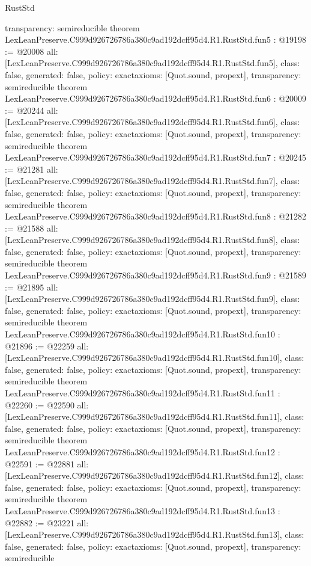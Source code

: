 \begin{lexlean}{RustStd}
\begin{coremodule}
{  transparency: semireducible
}
theorem LexLeanPreserve.C999d926726786a380c9ad192dcff95d4.R1.RustStd.fun5 : @19198 := @20008 {
  all: [LexLeanPreserve.C999d926726786a380c9ad192dcff95d4.R1.RustStd.fun5],
  class: false,
  generated: false,
  policy: exact{axioms: [Quot.sound, propext]},
  transparency: semireducible
}
theorem LexLeanPreserve.C999d926726786a380c9ad192dcff95d4.R1.RustStd.fun6 : @20009 := @20244 {
  all: [LexLeanPreserve.C999d926726786a380c9ad192dcff95d4.R1.RustStd.fun6],
  class: false,
  generated: false,
  policy: exact{axioms: [Quot.sound, propext]},
  transparency: semireducible
}
theorem LexLeanPreserve.C999d926726786a380c9ad192dcff95d4.R1.RustStd.fun7 : @20245 := @21281 {
  all: [LexLeanPreserve.C999d926726786a380c9ad192dcff95d4.R1.RustStd.fun7],
  class: false,
  generated: false,
  policy: exact{axioms: [Quot.sound, propext]},
  transparency: semireducible
}
theorem LexLeanPreserve.C999d926726786a380c9ad192dcff95d4.R1.RustStd.fun8 : @21282 := @21588 {
  all: [LexLeanPreserve.C999d926726786a380c9ad192dcff95d4.R1.RustStd.fun8],
  class: false,
  generated: false,
  policy: exact{axioms: [Quot.sound, propext]},
  transparency: semireducible
}
theorem LexLeanPreserve.C999d926726786a380c9ad192dcff95d4.R1.RustStd.fun9 : @21589 := @21895 {
  all: [LexLeanPreserve.C999d926726786a380c9ad192dcff95d4.R1.RustStd.fun9],
  class: false,
  generated: false,
  policy: exact{axioms: [Quot.sound, propext]},
  transparency: semireducible
}
theorem LexLeanPreserve.C999d926726786a380c9ad192dcff95d4.R1.RustStd.fun10 : @21896 := @22259 {
  all: [LexLeanPreserve.C999d926726786a380c9ad192dcff95d4.R1.RustStd.fun10],
  class: false,
  generated: false,
  policy: exact{axioms: [Quot.sound, propext]},
  transparency: semireducible
}
theorem LexLeanPreserve.C999d926726786a380c9ad192dcff95d4.R1.RustStd.fun11 : @22260 := @22590 {
  all: [LexLeanPreserve.C999d926726786a380c9ad192dcff95d4.R1.RustStd.fun11],
  class: false,
  generated: false,
  policy: exact{axioms: [Quot.sound, propext]},
  transparency: semireducible
}
theorem LexLeanPreserve.C999d926726786a380c9ad192dcff95d4.R1.RustStd.fun12 : @22591 := @22881 {
  all: [LexLeanPreserve.C999d926726786a380c9ad192dcff95d4.R1.RustStd.fun12],
  class: false,
  generated: false,
  policy: exact{axioms: [Quot.sound, propext]},
  transparency: semireducible
}
theorem LexLeanPreserve.C999d926726786a380c9ad192dcff95d4.R1.RustStd.fun13 : @22882 := @23221 {
  all: [LexLeanPreserve.C999d926726786a380c9ad192dcff95d4.R1.RustStd.fun13],
  class: false,
  generated: false,
  policy: exact{axioms: [Quot.sound, propext]},
  transparency: semireducible
}
\end{coremodule}
\end{lexlean}
